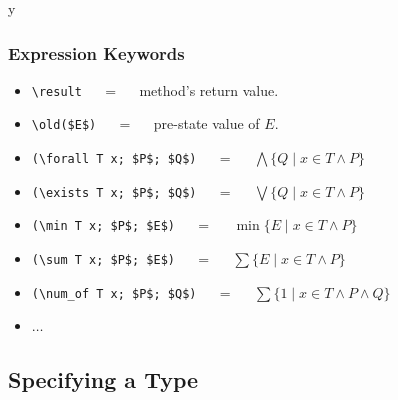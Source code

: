 \if y\MAKEHANDOUTS \documentclass[compress,landscape,handout]{beamer}
\begin{document}
\begin{frame}[fragile]
\frametitle{Expression Keywords}

\begin{itemize}
\item
\lstinline!\result! ~~ = ~~ method's return value.

\item
\lstinline[mathescape=true]!\old($E$)! ~~ = ~~ pre-state value of $E$.

\item
\lstinline[mathescape=true]!(\forall T x; $P$; $Q$)!
~~ = ~~ $\bigwedge \{ Q \mid x \in T \wedge P \}$

\item
\lstinline[mathescape=true]!(\exists T x; $P$; $Q$)!
~~ = ~~ $\bigvee \{ Q \mid x \in T \wedge P \}$

\item
\lstinline[mathescape=true]!(\min T x; $P$; $E$)!
~~ = ~~ $\min \{E \mid x \in T \wedge P \}$

\item
\lstinline[mathescape=true]!(\sum T x; $P$; $E$)!
~~ = ~~ $\sum \{E \mid x \in T \wedge P \}$

\item
\lstinline[mathescape=true]!(\num_of T x; $P$; $Q$)!
~~ = ~~ $\sum \{1 \mid x \in T \wedge P \wedge Q\}$

\item
$\ldots$
\end{itemize}
\end{frame}

\subsection[Exercise]{Specifying a Type}
\end{document}

